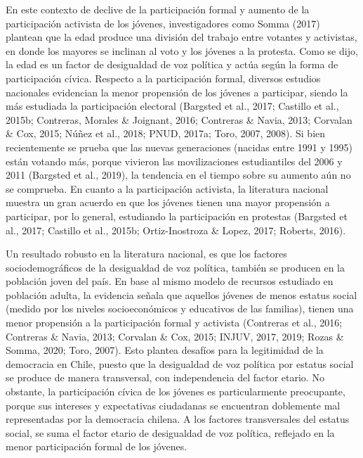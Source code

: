 \documentclass[12pt,twoside]{templates/facsothesis}
\begin{document}
En este contexto de declive de la participación formal y aumento de la participación activista de los jóvenes, investigadores como Somma (2017) plantean que la edad produce una división del trabajo entre votantes y activistas, en donde los mayores se inclinan al voto y los jóvenes a la protesta. Como se dijo, la edad es un factor de desigualdad de voz política y actúa según la forma de participación cívica. Respecto a la participación formal, diversos estudios nacionales evidencian la menor propensión de los jóvenes a participar, siendo la más estudiada la participación electoral (Bargsted et al., 2017; Castillo et al., 2015b; Contreras, Morales \& Joignant, 2016; Contreras \& Navia, 2013; Corvalan \& Cox, 2015; Núñez et al., 2018; PNUD, 2017a; Toro, 2007, 2008). Si bien recientemente se prueba que las nuevas generaciones (nacidas entre 1991 y 1995) están votando más, porque vivieron las movilizaciones estudiantiles del 2006 y 2011 (Bargsted et al., 2019), la tendencia en el tiempo sobre su aumento aún no se comprueba. En cuanto a la participación activista, la literatura nacional muestra un gran acuerdo en que los jóvenes tienen una mayor propensión a participar, por lo general, estudiando la participación en protestas (Bargsted et al., 2017; Castillo et al., 2015b; Ortiz-Inostroza \& Lopez, 2017; Roberts, 2016).

Un resultado robusto en la literatura nacional, es que los factores sociodemográficos de la desigualdad de voz política, también se producen en la población joven del país. En base al mismo modelo de recursos estudiado en población adulta, la evidencia señala que aquellos jóvenes de menos estatus social (medido por los niveles socioeconómicos y educativos de las familias), tienen una menor propensión a la participación formal y activista (Contreras et al., 2016; Contreras \& Navia, 2013; Corvalan \& Cox, 2015; INJUV, 2017, 2019; Rozas \& Somma, 2020; Toro, 2007). Esto plantea desafíos para la legitimidad de la democracia en Chile, puesto que la desigualdad de voz política por estatus social se produce de manera transversal, con independencia del factor etario. No obstante, la participación cívica de los jóvenes es particularmente preocupante, porque sus intereses y expectativas ciudadanas se encuentran doblemente mal representadas por la democracia chilena. A los factores transversales del estatus social, se suma el factor etario de desigualdad de voz política, reflejado en la menor participación formal de los jóvenes.
\end{document}
